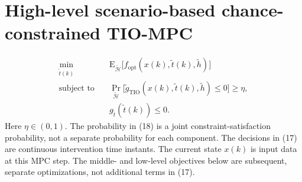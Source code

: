 \documentclass{article}
\begin{document}
\section*{High-level scenario-based chance-constrained TIO-MPC}
\begin{align}
\min_{\tilde t(k)}\quad &\mathrm E_{\tilde{\mathcal H}}\bigl[f_{\mathrm{opt}}(x(k),\tilde t(k),\tilde h)\bigr] \tag{17}\\
\text{subject to}\quad &\Pr_{\tilde{\mathcal H}}\bigl[\tilde g_{\mathrm{TIO}}(x(k),\tilde t(k),\tilde h)\leq0\bigr]\geq\eta, \tag{18}\\
&g_{\tilde t}(\tilde t(k))\leq0. \tag{19}
\end{align}
Here $\eta\in(0,1)$. The probability in (18) is a joint constraint-satisfaction probability, not a separate probability for each component. The decisions in (17) are continuous intervention time instants. The current state $x(k)$ is input data at this MPC step. The middle- and low-level objectives below are subsequent, separate optimizations, not additional terms in (17).
\end{document}
